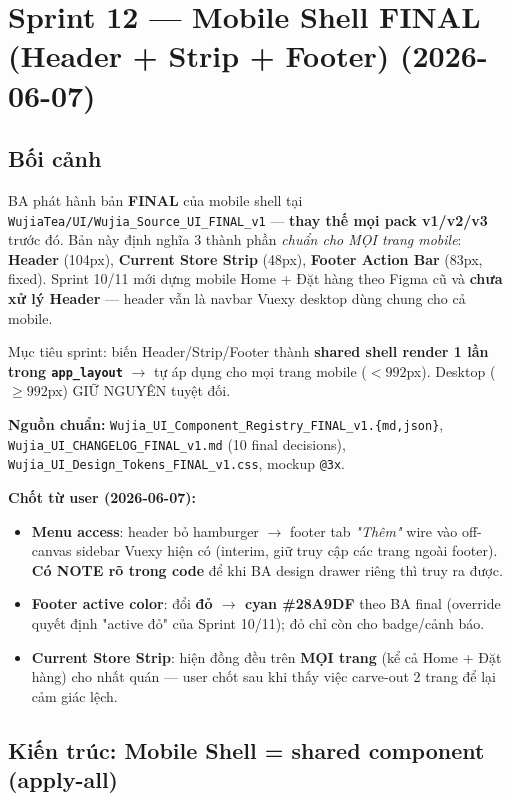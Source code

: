 \chapter{Sprint 12 --- Mobile Shell FINAL (Header + Strip + Footer) (2026-06-07)}

\section{Bối cảnh}

BA phát hành bản \textbf{FINAL} của mobile shell tại
\texttt{WujiaTea/UI/Wujia\_Source\_UI\_FINAL\_v1} ---
\textbf{thay thế mọi pack v1/v2/v3} trước đó. Bản này định nghĩa 3 thành phần
\emph{chuẩn cho MỌI trang mobile}: \textbf{Header} (104px), \textbf{Current Store
Strip} (48px), \textbf{Footer Action Bar} (83px, fixed). Sprint 10/11 mới dựng
mobile Home + Đặt hàng theo Figma cũ và \textbf{chưa xử lý Header} --- header vẫn
là navbar Vuexy desktop dùng chung cho cả mobile.

Mục tiêu sprint: biến Header/Strip/Footer thành \textbf{shared shell render 1 lần
trong \texttt{app\_layout}} \(\rightarrow\) tự áp dụng cho mọi trang mobile
(\(<992\)px). Desktop (\(\geq 992\)px) GIỮ NGUYÊN tuyệt đối.

\textbf{Nguồn chuẩn:} \texttt{Wujia\_UI\_Component\_Registry\_FINAL\_v1.\{md,json\}},
\texttt{Wujia\_UI\_CHANGELOG\_FINAL\_v1.md} (10 final decisions),
\texttt{Wujia\_UI\_Design\_Tokens\_FINAL\_v1.css}, mockup \texttt{@3x}.

\textbf{Chốt từ user (2026-06-07):}
\begin{itemize}
  \item \textbf{Menu access}: header bỏ hamburger \(\rightarrow\) footer tab
        \emph{"Thêm"} wire vào off-canvas sidebar Vuexy hiện có (interim, giữ truy
        cập các trang ngoài footer). \textbf{Có NOTE rõ trong code} để khi BA
        design drawer riêng thì truy ra được.
  \item \textbf{Footer active color}: đổi \textbf{đỏ \(\rightarrow\) cyan
        \#28A9DF} theo BA final (override quyết định "active đỏ" của Sprint 10/11);
        đỏ chỉ còn cho badge/cảnh báo.
  \item \textbf{Current Store Strip}: hiện đồng đều trên \textbf{MỌI trang} (kể cả
        Home + Đặt hàng) cho nhất quán --- user chốt sau khi thấy việc carve-out
        2 trang để lại cảm giác lệch.
\end{itemize}

\section{Kiến trúc: Mobile Shell = shared component (apply-all)}

